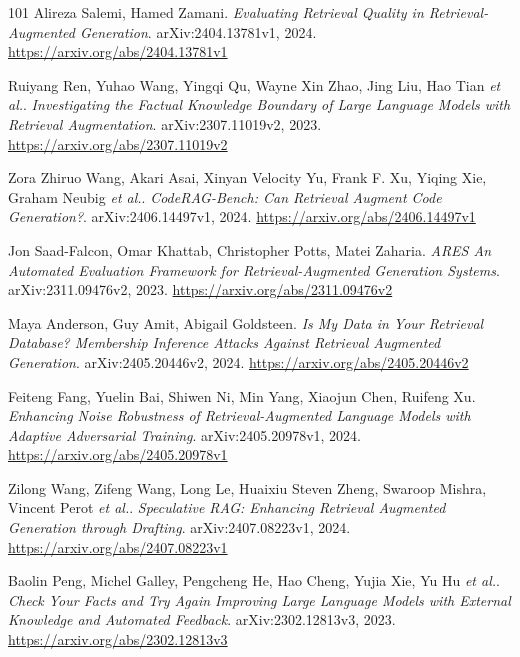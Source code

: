 \documentclass[11pt,a4paper]{article}
\begin{document}
\begin{thebibliography}{101}
Alireza Salemi, Hamed Zamani.
\newblock \emph{Evaluating Retrieval Quality in Retrieval-Augmented Generation}.
\newblock arXiv:2404.13781v1, 2024.
\newblock \url{https://arxiv.org/abs/2404.13781v1}

Ruiyang Ren, Yuhao Wang, Yingqi Qu, Wayne Xin Zhao, Jing Liu, Hao Tian \emph{et al.}.
\newblock \emph{Investigating the Factual Knowledge Boundary of Large Language Models with Retrieval Augmentation}.
\newblock arXiv:2307.11019v2, 2023.
\newblock \url{https://arxiv.org/abs/2307.11019v2}

Zora Zhiruo Wang, Akari Asai, Xinyan Velocity Yu, Frank F. Xu, Yiqing Xie, Graham Neubig \emph{et al.}.
\newblock \emph{CodeRAG-Bench: Can Retrieval Augment Code Generation?}.
\newblock arXiv:2406.14497v1, 2024.
\newblock \url{https://arxiv.org/abs/2406.14497v1}

Jon Saad-Falcon, Omar Khattab, Christopher Potts, Matei Zaharia.
\newblock \emph{ARES An Automated Evaluation Framework for Retrieval-Augmented Generation Systems}.
\newblock arXiv:2311.09476v2, 2023.
\newblock \url{https://arxiv.org/abs/2311.09476v2}

Maya Anderson, Guy Amit, Abigail Goldsteen.
\newblock \emph{Is My Data in Your Retrieval Database? Membership Inference Attacks Against Retrieval Augmented Generation}.
\newblock arXiv:2405.20446v2, 2024.
\newblock \url{https://arxiv.org/abs/2405.20446v2}

Feiteng Fang, Yuelin Bai, Shiwen Ni, Min Yang, Xiaojun Chen, Ruifeng Xu.
\newblock \emph{Enhancing Noise Robustness of Retrieval-Augmented Language Models with Adaptive Adversarial Training}.
\newblock arXiv:2405.20978v1, 2024.
\newblock \url{https://arxiv.org/abs/2405.20978v1}

Zilong Wang, Zifeng Wang, Long Le, Huaixiu Steven Zheng, Swaroop Mishra, Vincent Perot \emph{et al.}.
\newblock \emph{Speculative RAG: Enhancing Retrieval Augmented Generation through Drafting}.
\newblock arXiv:2407.08223v1, 2024.
\newblock \url{https://arxiv.org/abs/2407.08223v1}

Baolin Peng, Michel Galley, Pengcheng He, Hao Cheng, Yujia Xie, Yu Hu \emph{et al.}.
\newblock \emph{Check Your Facts and Try Again Improving Large Language Models with External Knowledge and Automated Feedback}.
\newblock arXiv:2302.12813v3, 2023.
\newblock \url{https://arxiv.org/abs/2302.12813v3}


\end{thebibliography}
\end{document}
